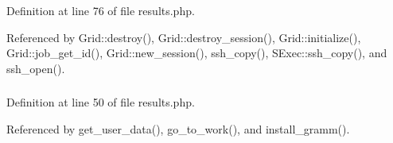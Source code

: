 Definition at line 76 of file results.php.

Referenced by Grid::destroy(), Grid::destroy\_\-session(), Grid::initialize(), Grid::job\_\-get\_\-id(), Grid::new\_\-session(), ssh\_\-copy(), SExec::ssh\_\-copy(), and ssh\_\-open().
\subsubsection{}\label{results_8php_a1}




Definition at line 50 of file results.php.

Referenced by get\_\-user\_\-data(), go\_\-to\_\-work(), and install\_\-gramm().